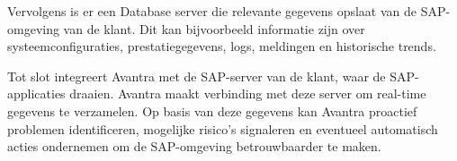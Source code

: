 Vervolgens is er een Database server die relevante gegevens opslaat van de SAP-omgeving van de klant. Dit kan bijvoorbeeld informatie zijn over systeemconfiguraties, prestatiegegevens, logs, meldingen en historische trends. 

Tot slot integreert Avantra met de SAP-server van de klant, waar de SAP-applicaties draaien. Avantra maakt verbinding met deze server om real-time gegevens te verzamelen.
Op basis van deze gegevens kan Avantra proactief problemen identificeren, mogelijke risico's signaleren en eventueel automatisch acties ondernemen om de SAP-omgeving betrouwbaarder te maken.

